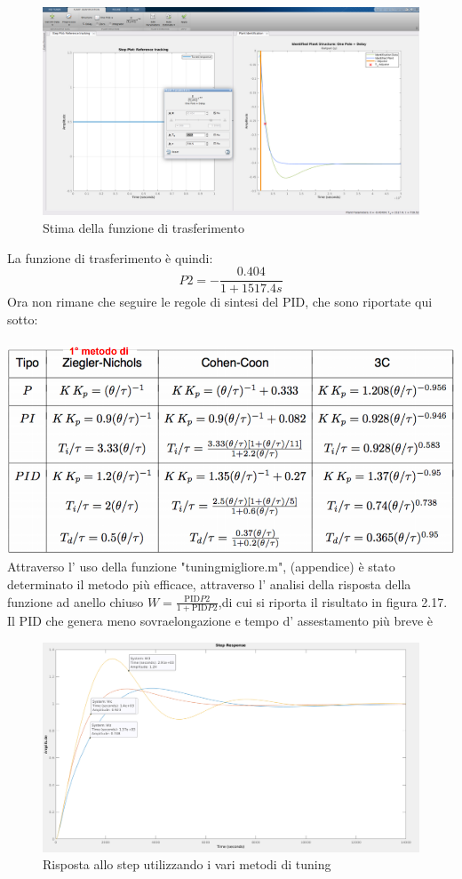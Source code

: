 \documentclass[Lau,noexaminfo]{sapthesis}
\begin{document}
 	\begin{figure}
 		\centering
 		\includegraphics[height=0.4\textheight]{P2_estimating}	 	\caption{Stima della funzione di trasferimento}
 	\end{figure}\newpage
	La funzione di trasferimento è quindi:
	\begin{equation}
	P2=-\frac{0.404}{1+1517.4s}
	\end{equation}
	Ora non rimane che seguire le regole di sintesi del PID, che sono riportate qui sotto:\\\\
	\includegraphics[height=0.32\textheight,]{Regole_PID}
	Attraverso l' uso della funzione "tuning\textunderscore migliore.m", (appendice) è stato determinato il metodo più efficace, attraverso l' analisi della risposta della funzione ad anello chiuso $W=\frac{\text{PID}P2}{1+\text{PID}P2}$,di cui si riporta il risultato in figura 2.17.\\
	Il PID che genera meno sovraelongazione e tempo d' assestamento più breve è
	\begin{figure}[h]
		\centering
		\setlength{\unitlength}{0.27mm}
		\includegraphics[scale=0.38,angle=-90]{step_response_metodi_P2}	 	\caption{Risposta allo step utilizzando i vari metodi di tuning}
	\end{figure}
\end{document}
